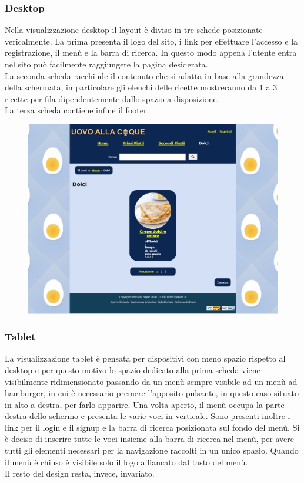 \subsubsection{Desktop}
\label{ssub:desktop}
Nella visualizzazione desktop il layout è diviso in tre schede posizionate vericalmente. La prima presenta il logo del sito, i link per effettuare l'accesso e la registrazione, il menù e la barra di ricerca. In questo modo appena l'utente entra nel sito può facilmente raggiungere la pagina desiderata. \\
La seconda scheda racchiude il contenuto che si adatta in base alla grandezza della schermata, in particolare gli elenchi delle ricette mostreranno da 1 a 3 ricette per fila dipendentemente dallo spazio a disposizione. \\
La terza scheda contiene infine il footer.  
\begin{figure}[H]
	\centering
	\includegraphics[width=16cm]{img/progettazione/desktop.jpg}
\end{figure}
\subsubsection{Tablet}
\label{ssub:tablet}
La visualizzazione tablet è pensata per dispositivi con meno spazio rispetto al desktop e per questo motivo lo spazio dedicato alla prima scheda viene visibilmente ridimensionato passando da un menù sempre visibile ad un menù ad hamburger, in cui è necessario premere l'apposito pulsante, in questo caso situato in alto a destra, per farlo apparire. Una volta aperto, il menù occupa la parte destra dello schermo e presenta le varie voci in verticale. Sono presenti inoltre i link per il login e il signup e la barra di ricerca posizionata sul fondo del menù. Si è deciso di inserire tutte le voci insieme alla barra di ricerca nel menù, per avere tutti gli elementi necessari per la navigazione raccolti in un unico spazio. Quando il menù è chiuso è visibile solo il logo affiancato dal tasto del menù. \\
Il resto del design resta, invece, invariato.

